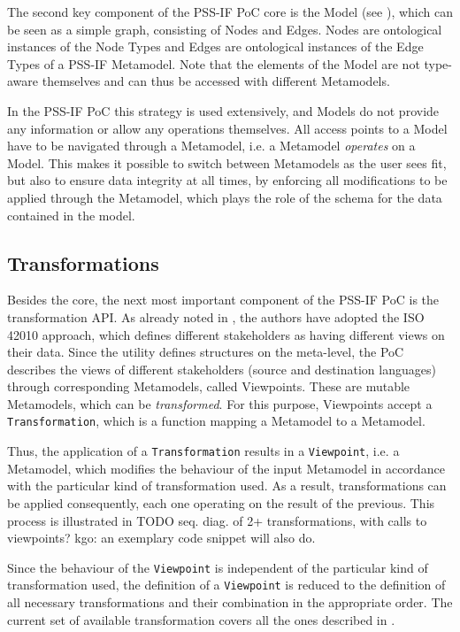 The second key component of the PSS-IF PoC core is the Model (see ), which can be seen as a simple graph, consisting of Nodes and Edges. Nodes are ontological instances of the Node Types and Edges are ontological instances of the Edge Types of a PSS-IF Metamodel. Note that the elements of the Model are not type-aware themselves and can thus be accessed with different Metamodels.

In the PSS-IF PoC this strategy is used extensively, and Models do not provide any information or allow any operations themselves. All access points to a Model have to be navigated through a Metamodel, i.e. a Metamodel \textit{operates} on a Model. This makes it possible to switch between Metamodels as the user sees fit, but also to ensure data integrity at all times, by enforcing all modifications to be applied through the Metamodel, which plays the role of the schema for the data contained in the model.

\subsection{Transformations}

Besides the core, the next most important component of the PSS-IF PoC is the transformation API. As already noted in , the authors have adopted the ISO 42010 approach, which defines different stakeholders as having different views on their data. Since the utility defines structures on the meta-level, the PoC describes the views of different stakeholders (source and destination languages) through corresponding Metamodels, called Viewpoints. These are mutable Metamodels, which can be \textit{transformed}. For this purpose, Viewpoints accept a \texttt{Transformation}, which is a function mapping a Metamodel to a Metamodel.

Thus, the application of a \texttt{Transformation} results in a \texttt{Viewpoint}, i.e. a Metamodel, which modifies the behaviour of the input Metamodel in accordance with the particular kind of transformation used. As a result, transformations can be applied consequently, each one operating on the result of the previous. This process is illustrated in \color{red} TODO seq. diag. of 2+ transformations, with calls to viewpoints? kgo: an exemplary code snippet will also do\color{black}.

Since the behaviour of the \texttt{Viewpoint} is independent of the particular kind of transformation used, the definition of a \texttt{Viewpoint} is reduced to the definition of all necessary transformations and their combination in the appropriate order. The current set of available transformation covers all the ones described in .

